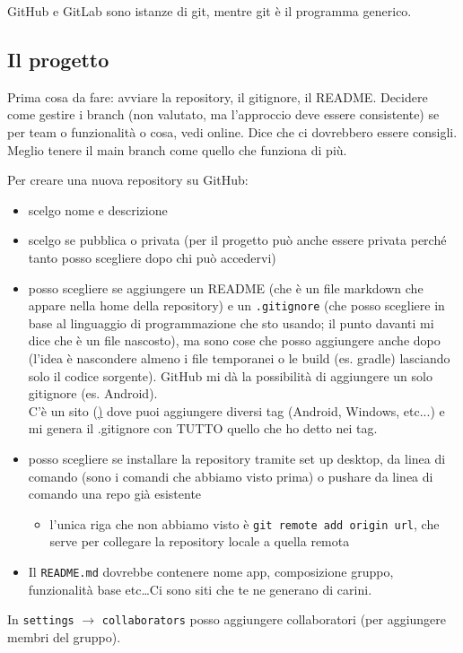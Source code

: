 \par GitHub e GitLab sono istanze di git, mentre git è il programma generico.

\subsection{Il progetto}
\par Prima cosa da fare: avviare la repository, il gitignore, il README. Decidere come gestire i branch (non valutato, ma l'approccio deve essere consistente) se per team o funzionalità o cosa, vedi online. Dice che ci dovrebbero essere consigli. Meglio tenere il main branch come quello che funziona di più.
\par Per creare una nuova repository su GitHub:
\begin{itemize}
    \item scelgo nome e descrizione
    \item scelgo se pubblica o privata (per il progetto può anche essere privata perché tanto posso scegliere dopo chi può accedervi)
    \item posso scegliere se aggiungere un README (che è un file markdown che appare nella home della repository) e un \texttt{.gitignore} (che posso scegliere in base al linguaggio di programmazione che sto usando; il punto davanti mi dice che è un file nascosto), ma sono cose che posso aggiungere anche dopo (l'idea è nascondere almeno i file temporanei o le build (es. gradle) lasciando solo il codice sorgente). GitHub mi dà la possibilità di aggiungere un solo gitignore (es. Android).\\
    C'è un sito (\href{gitignore.io}) dove puoi aggiungere diversi tag (Android, Windows, etc...) e mi genera il .gitignore con TUTTO quello che ho detto nei tag.
    \item posso scegliere se installare la repository tramite set up desktop, da linea di comando (sono i comandi che abbiamo visto prima) o pushare da linea di comando una repo già esistente
    \begin{itemize}
        \item l'unica riga che non abbiamo visto è \texttt{git remote add origin url}, che serve per collegare la repository locale a quella remota
    \end{itemize}
    \item Il \texttt{README.md} dovrebbe contenere nome app, composizione gruppo, funzionalità base etc\dots Ci sono siti che te ne generano di carini.
\end{itemize}
\par In \texttt{settings} $\rightarrow$ \texttt{collaborators} posso aggiungere collaboratori (per aggiungere membri del gruppo).